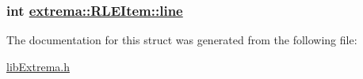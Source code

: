 \hypertarget{structextrema_1_1RLEItem_2b94a01e8ce9bbff252d93283c490cd6}{
\subsubsection[line]{\setlength{\rightskip}{0pt plus 5cm}int \hyperlink{structextrema_1_1RLEItem_2b94a01e8ce9bbff252d93283c490cd6}{extrema::RLEItem::line}}}
\label{structextrema_1_1RLEItem_2b94a01e8ce9bbff252d93283c490cd6}




The documentation for this struct was generated from the following file:\begin{CompactItemize}
\item 
\hyperlink{libExtrema_8h}{lib\-Extrema.h}\end{CompactItemize}
